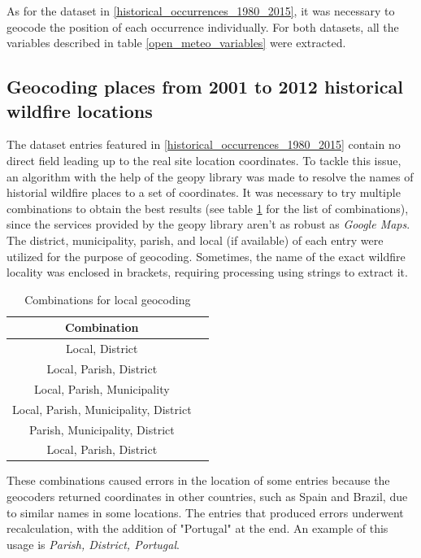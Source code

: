 As for the dataset in \ref{historical_occurrences_1980_2015}, it was necessary to geocode the position of each occurrence individually. For both datasets, all the variables described in table \ref{open_meteo_variables} were extracted.

\subsection{Geocoding places from 2001 to 2012 historical wildfire locations}
\label{geocoding_historical}
The dataset entries featured in \ref{historical_occurrences_1980_2015} contain no direct field leading up to the real site location coordinates. To tackle this issue, an algorithm with the help of the geopy library \cite{geopy} was made to resolve the names of historial wildfire places to a set of coordinates. It was necessary to try multiple combinations to obtain the best results (see table \ref{geocoding_entries_2001_2012} for the list of combinations), since the services provided by the geopy library aren't as robust as \textit{Google Maps}. The district, municipality, parish, and local (if available) of each entry were utilized for the purpose of geocoding. Sometimes, the name of the exact wildfire locality was enclosed in brackets, requiring processing using strings to extract it.


\begin{table}[H]
	\caption{Combinations for local geocoding}
	\label{geocoding_entries_2001_2012}
	\centering
	\small
	\begin{tabular}{cp{7.5cm}|}
		\hline
		\textbf{Combination}\\
		\hline
		Local, District\\
		\hline
		Local, Parish, District\\
		\hline
		Local, Parish, Municipality\\
		\hline
		Local, Parish, Municipality, District\\
		\hline
		Parish, Municipality, District\\
		\hline
		Local, Parish, District\\
		\hline
	\end{tabular}
\end{table}


These combinations caused errors in the location of some entries because the geocoders returned coordinates in other countries, such as Spain and Brazil, due to similar names in some locations. The entries that produced errors underwent recalculation, with the addition of "Portugal" at the end. An example of this usage is  {\it Parish, District, Portugal}.

